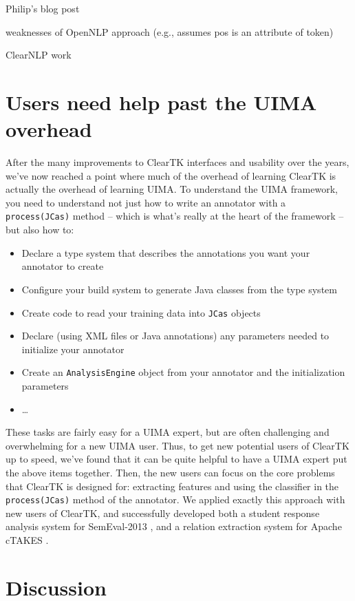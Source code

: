 \documentclass[10pt, a4paper]{article}
\newcommand{\code}[1]{\texttt{\small #1}}
\begin{document}
Philip's blog post

weaknesses of OpenNLP approach (e.g., assumes pos is an attribute of token)

ClearNLP work


\section{Users need help past the UIMA overhead}
After the many improvements to ClearTK interfaces and usability over the years, we've now reached a point where much of the overhead of learning ClearTK is actually the overhead of learning UIMA.
To understand the UIMA framework, you need to understand not just how to write an annotator with a \code{process(JCas)} method -- which is what's really at the heart of the framework -- but also how to:
\begin{itemize}
\item Declare a type system that describes the annotations you want your annotator to create
\item Configure your build system to generate Java classes from the type system
\item Create code to read your training data into \code{JCas} objects
\item Declare (using XML files or Java annotations) any parameters needed to initialize your annotator
\item Create an \code{AnalysisEngine} object from your annotator and the initialization parameters
\item \ldots
\end{itemize}
These tasks are fairly easy for a UIMA expert, but are often challenging and overwhelming for a new UIMA user.
Thus, to get new potential users of ClearTK up to speed, we've found that it can be quite helpful to have a UIMA expert put the above items together.
Then, the new users can focus on the core problems that ClearTK is designed for: extracting features and using the classifier in the \code{process(JCas)} method of the annotator.
We applied exactly this approach with new users of ClearTK, and successfully developed both a student response analysis system for SemEval-2013 \cite{okoye-bethard-sumner:2013:SemEval-2013}, and a relation extraction system for Apache cTAKES \cite{dligach2013discovering}.

\section{Discussion}



\end{document}
